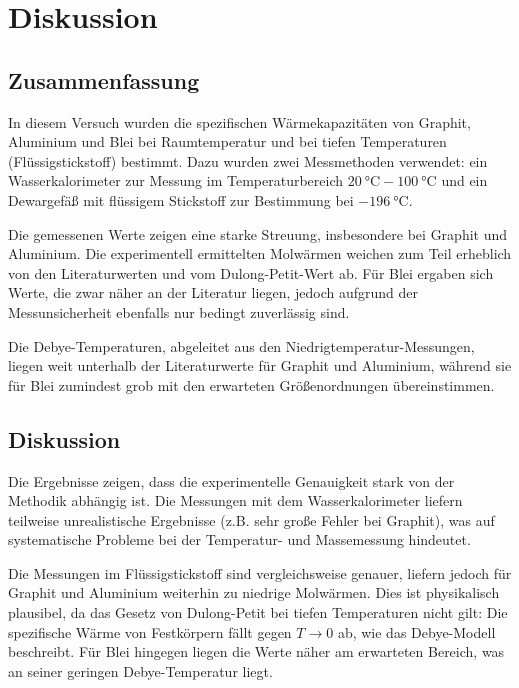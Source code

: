 \chapter{Diskussion}

\section{Zusammenfassung}  
In diesem Versuch wurden die spezifischen Wärmekapazitäten von Graphit, Aluminium und Blei bei Raumtemperatur und bei tiefen Temperaturen (Flüssigstickstoff) bestimmt. Dazu wurden zwei Messmethoden verwendet: ein Wasserkalorimeter zur Messung im Temperaturbereich \(\SI{20}{\celsius} - \SI{100}{\celsius}\) und ein Dewargefäß mit flüssigem Stickstoff zur Bestimmung bei \(\SI{-196}{\celsius}\).  

Die gemessenen Werte zeigen eine starke Streuung, insbesondere bei Graphit und Aluminium. Die experimentell ermittelten Molwärmen weichen zum Teil erheblich von den Literaturwerten und vom Dulong-Petit-Wert ab. Für Blei ergaben sich Werte, die zwar näher an der Literatur liegen, jedoch aufgrund der Messunsicherheit ebenfalls nur bedingt zuverlässig sind.  

Die Debye-Temperaturen, abgeleitet aus den Niedrigtemperatur-Messungen, liegen weit unterhalb der Literaturwerte für Graphit und Aluminium, während sie für Blei zumindest grob mit den erwarteten Größenordnungen übereinstimmen.

\section{Diskussion}  
Die Ergebnisse zeigen, dass die experimentelle Genauigkeit stark von der Methodik abhängig ist. Die Messungen mit dem Wasserkalorimeter liefern teilweise unrealistische Ergebnisse (z.B. sehr große Fehler bei Graphit), was auf systematische Probleme bei der Temperatur- und Massemessung hindeutet.  

Die Messungen im Flüssigstickstoff sind vergleichsweise genauer, liefern jedoch für Graphit und Aluminium weiterhin zu niedrige Molwärmen. Dies ist physikalisch plausibel, da das Gesetz von Dulong-Petit bei tiefen Temperaturen nicht gilt: Die spezifische Wärme von Festkörpern fällt gegen \(T \to 0\) ab, wie das Debye-Modell beschreibt. Für Blei hingegen liegen die Werte näher am erwarteten Bereich, was an seiner geringen Debye-Temperatur liegt.  

